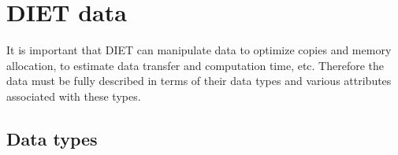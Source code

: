 
\chapter{DIET data}
\label{ch:data}

It is important that DIET can manipulate data to optimize copies and
memory allocation, to estimate data transfer and computation time,
etc. Therefore the data must be fully described in terms of their data 
types and various attributes associated with these types.

\section{Data types}
\label{sec:types}

